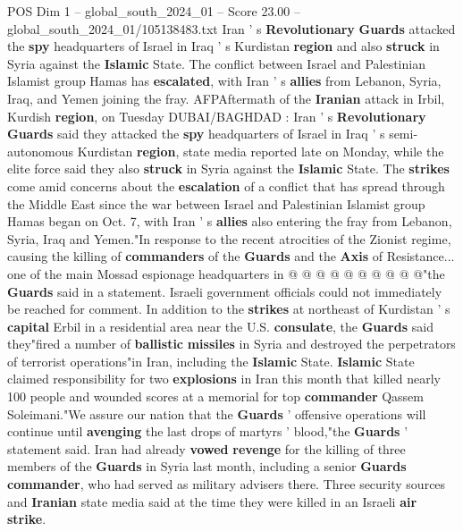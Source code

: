 \begin{textsample}{POS Dim 1 – global\_south\_2024\_01 – Score 23.00 – global\_south\_2024\_01/105138483.txt}  \label{ex:f1_pos_106}
Iran ' s \textbf{Revolutionary} \textbf{Guards} attacked the \textbf{spy} headquarters of Israel in Iraq ' s Kurdistan \textbf{region} and also \textbf{struck} in Syria against the \textbf{Islamic} State.
The conflict between Israel and Palestinian Islamist group Hamas has \textbf{escalated}, with Iran ' s \textbf{allies} from Lebanon, Syria, Iraq, and Yemen joining the fray.
AFPAftermath of the \textbf{Iranian} attack in Irbil, Kurdish \textbf{region}, on Tuesday DUBAI/BAGHDAD : Iran ' s \textbf{Revolutionary} \textbf{Guards} said they attacked the \textbf{spy} headquarters of Israel in Iraq ' s semi-autonomous Kurdistan \textbf{region}, state media reported late on Monday, while the elite force said they also \textbf{struck} in Syria against the \textbf{Islamic} State.
The \textbf{strikes} come amid concerns about the \textbf{escalation} of a conflict that has spread through the Middle East since the war between Israel and Palestinian Islamist group Hamas began on Oct. 7, with Iran ' s \textbf{allies} also entering the fray from Lebanon, Syria, Iraq and Yemen."In response to the recent atrocities of the Zionist regime, causing the killing of \textbf{commanders} of the \textbf{Guards} and the \textbf{Axis} of Resistance... one of the main Mossad espionage headquarters in @ @ @ @ @ @ @ @ @ @"the \textbf{Guards} said in a statement.
Israeli government officials could not immediately be reached for comment.
In addition to the \textbf{strikes} at northeast of Kurdistan ' s \textbf{capital} Erbil in a residential area near the U.S. \textbf{consulate}, the \textbf{Guards} said they"fired a number of \textbf{ballistic} \textbf{missiles} in Syria and destroyed the perpetrators of terrorist operations"in Iran, including the \textbf{Islamic} State. \textbf{Islamic} State claimed responsibility for two \textbf{explosions} in Iran this month that killed nearly 100 people and wounded scores at a memorial for top \textbf{commander} Qassem Soleimani."We assure our nation that the \textbf{Guards} ' offensive operations will continue until \textbf{avenging} the last drops of martyrs ' blood,"the \textbf{Guards} ' statement said.
Iran had already \textbf{vowed} \textbf{revenge} for the killing of three members of the \textbf{Guards} in Syria last month, including a senior \textbf{Guards} \textbf{commander}, who had served as military advisers there.
Three security sources and \textbf{Iranian} state media said at the time they were killed in an Israeli \textbf{air} \textbf{strike}.

\end{textsample}
